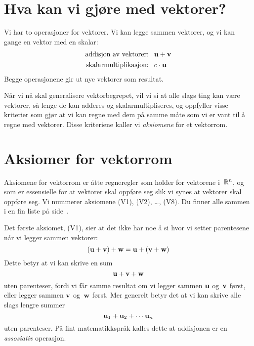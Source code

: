 



\section*{Hva kan vi gjøre med vektorer?}

Vi har to operasjoner for vektorer.  Vi kan legge sammen vektorer, og
vi kan gange en vektor med en skalar:
\begin{align*}
\text{addisjon av vektorer: }&\ \mathbf{u} + \mathbf{v} \\
\text{skalarmultiplikasjon: }&\ c \cdot \mathbf{u}
\end{align*}
Begge operasjonene gir ut nye vektorer som resultat.

Når vi nå skal generalisere vektorbegrepet, vil vi si at alle slags
ting kan være vektorer, så lenge de kan adderes og
skalarmultipliseres, og oppfyller visse kriterier som gjør at vi kan
regne med dem på samme måte som vi er vant til å regne med vektorer.
Disse kriteriene kaller vi \emph{aksiomene} for et vektorrom.


\section*{Aksiomer for vektorrom}

Aksiomene for vektorrom er åtte regneregler som holder for vektorene
i~$\mathbb{R}^n$, og som er essensielle for at vektorer skal oppføre seg slik
vi synes at vektorer skal oppføre seg.  Vi nummerer aksiomene (V1),
(V2), \ldots, (V8).  Du finner alle sammen i en fin liste på
side~\pageref{fig:aksiomene}.

Det første aksiomet, (V1), sier at det ikke har noe å si hvor vi
setter parentesene når vi legger sammen vektorer:
\[
(\mathbf{u} + \mathbf{v}) + \mathbf{w} = \mathbf{u} + (\mathbf{v} + \mathbf{w})
\]
Dette betyr at vi kan skrive en sum
\[
\mathbf{u} + \mathbf{v} + \mathbf{w}
\]
uten parenteser, fordi vi får samme resultat om vi legger sammen
$\mathbf{u}$ og~$\mathbf{v}$ først, eller legger sammen $\mathbf{v}$ og~$\mathbf{w}$
først.  Mer generelt betyr det at vi kan skrive alle slags lengre
summer
\[
\mathbf{u}_1 + \mathbf{u}_2 + \cdots \mathbf{u}_n
\]
uten parenteser.  På fint matematikkspråk kalles dette at addisjonen
er en \emph{assosiativ} operasjon.

